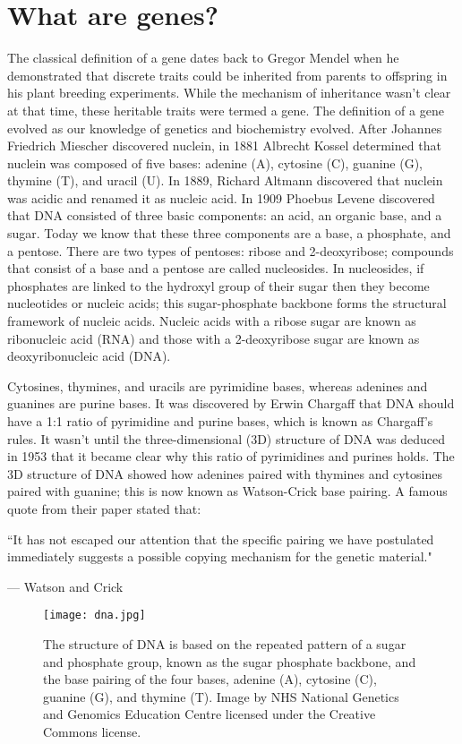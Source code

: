 \section{What are genes?}

The classical definition of a gene dates back to Gregor Mendel when he demonstrated that discrete traits could be inherited from parents to offspring in his plant breeding experiments. While the mechanism of inheritance wasn't clear at that time, these heritable traits were termed a gene. The definition of a gene evolved as our knowledge of genetics and biochemistry evolved\cite{pmid17567988}. After Johannes Friedrich Miescher discovered nuclein, in 1881 Albrecht Kossel determined that nuclein was composed of five bases: adenine (A), cytosine (C), guanine (G), thymine (T), and uracil (U). In 1889, Richard Altmann discovered that nuclein was acidic and renamed it as nucleic acid. In 1909 Phoebus Levene discovered that DNA consisted of three basic components: an acid, an organic base, and a sugar. Today we know that these three components are a base, a phosphate, and a pentose. There are two types of pentoses: ribose and 2-deoxyribose; compounds that consist of a base and a pentose are called nucleosides. In nucleosides, if phosphates are linked to the hydroxyl group of their sugar then they become nucleotides or nucleic acids; this sugar-phosphate backbone forms the structural framework of nucleic acids. Nucleic acids with a ribose sugar are known as ribonucleic acid (RNA) and those with a 2-deoxyribose sugar are known as deoxyribonucleic acid (DNA).

Cytosines, thymines, and uracils are pyrimidine bases, whereas adenines and guanines are purine bases. It was discovered by Erwin Chargaff that DNA should have a 1:1 ratio of pyrimidine and purine bases, which is known as Chargaff's rules. It wasn't until the three-dimensional (3D) structure of DNA was deduced\cite{WATSON_1953} in 1953 that it became clear why this ratio of pyrimidines and purines holds. The 3D structure of DNA showed how adenines paired with thymines and cytosines paired with guanine; this is now known as Watson-Crick base pairing. A famous quote from their paper stated that:

\epigraph{``It has not escaped our attention that the specific pairing we have postulated immediately suggests a possible copying mechanism for the genetic material."}{--- \textup{Watson and Crick}}

\begin{figure}[h]
   \centering
   \texttt{[image: dna.jpg]}
   \caption[The structure of DNA]{The structure of DNA is based on the repeated pattern of a sugar and phosphate group, known as the sugar phosphate backbone, and the base pairing of the four bases, adenine (A), cytosine (C), guanine (G), and thymine (T). Image by NHS National Genetics and Genomics Education Centre licensed under the Creative Commons license.}
   \label{fig:dna}
\end{figure}

